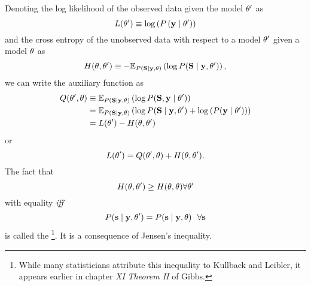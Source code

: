 Denoting the log likelihood of the observed data given the model
$\theta'$ as
\begin{equation*}
  L(\theta') \equiv \log \left( P \left(\mathbf{y}\mid \theta' \right)\right)
\end{equation*}
and the cross entropy of the unobserved data with respect to a model
$\theta'$ given a model $\theta$ as
\begin{equation*}
  H(\theta, \theta') \equiv - \mathbb{E}_{P
    \left({\bf S}\mid \mathbf{y},\theta \right)} \left( \log P({\bf S}\mid \mathbf{y},\theta')
  \right),
\end{equation*}
we can write the auxiliary function as
\begin{align*}
  Q(\theta',\theta) &\equiv \mathbb{E}_{P \left({\bf S}\mid \mathbf{y} ,\theta\right)}
  \left( \log P({\bf S},\mathbf{y}\mid \theta') \right)\\
  &= \mathbb{E}_{P \left({\bf S}\mid \mathbf{y} ,\theta \right)} \left( \log
    P({\bf S}\mid \mathbf{y},\theta') + \log \left( P(\mathbf{y}\mid \theta') \right)
  \right)\\
  &= L(\theta') - H(\theta, \theta')
\end{align*}
or
\begin{equation}
  \label{eq:LQH}
   L(\theta') = Q(\theta',\theta) + H(\theta,
   \theta').
\end{equation}
The fact that
\begin{equation}
  \label{eq:GibbsIE}
  H(\theta, \theta') \geq  H(\theta, \theta)
  \forall \theta'
\end{equation}
with equality \emph{iff}
\begin{equation*}
  P({\bf s}\mid \mathbf{y},\theta') =  P({\bf s}\mid \mathbf{y},\theta) ~~ \forall {\bf s}
\end{equation*}
is called the \emph{}\footnote{While many
  statisticians attribute this inequality to Kullback and
  Leibler\cite{Kullback51}, it appears earlier in chapter {\em XI}
  {\em Theorem II} of Gibbs\cite{Gibbs}.}.  It is a consequence of
 Jensen's inequality.

